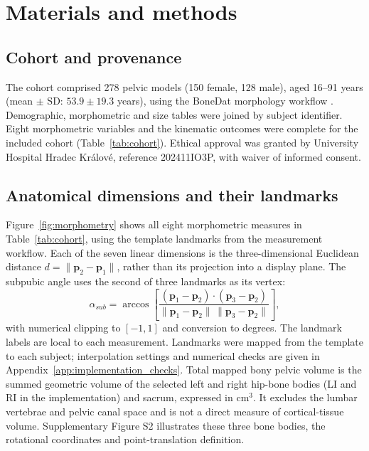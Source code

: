 \section{Materials and methods}
\subsection{Cohort and provenance}
The cohort comprised 278 pelvic models (150 female, 128 male), aged 16--91 years (mean $\pm$ SD: $53.9\pm19.3$ years), using the BoneDat morphology workflow \citep{HenyssKuchar2025BoneDat}. Demographic, morphometric and size tables were joined by subject identifier. Eight morphometric variables and the kinematic outcomes were complete for the included cohort (Table~\ref{tab:cohort}). Ethical approval was granted by University Hospital Hradec Kr\'alov\'e, reference 202411IO3P, with waiver of informed consent.
\begin{table}[htbp]
\centering
\caption{Demographic and morphometric characteristics. Values are mean $\pm$ SD; linear dimensions and the subpubic angle are measured from mapped landmarks. Bony pelvic volume sums the selected left and right hip-bone bodies and sacrum.}
\label{tab:cohort}
\end{table}

\subsection{Anatomical dimensions and their landmarks}
Figure~\ref{fig:morphometry} shows all eight morphometric measures in Table~\ref{tab:cohort}, using the template landmarks from the measurement workflow. Each of the seven linear dimensions is the three-dimensional Euclidean distance $d=\|\mathbf p_2-\mathbf p_1\|$, rather than its projection into a display plane. The subpubic angle uses the second of three landmarks as its vertex:
\begin{equation}
\alpha_{sub}=\arccos\!\left[\frac{(\mathbf p_1-\mathbf p_2)\cdot(\mathbf p_3-\mathbf p_2)}{\|\mathbf p_1-\mathbf p_2\|\,\|\mathbf p_3-\mathbf p_2\|}\right],
\end{equation}
with numerical clipping to $[-1,1]$ and conversion to degrees. The landmark labels are local to each measurement. Landmarks were mapped from the template to each subject; interpolation settings and numerical checks are given in Appendix~\ref{app:implementation_checks}. Total mapped bony pelvic volume is the summed geometric volume of the selected left and right hip-bone bodies (LI and RI in the implementation) and sacrum, expressed in cm$^3$. It excludes the lumbar vertebrae and pelvic canal space and is not a direct measure of cortical-tissue volume. Supplementary Figure S2 illustrates these three bone bodies, the rotational coordinates and point-translation definition.

